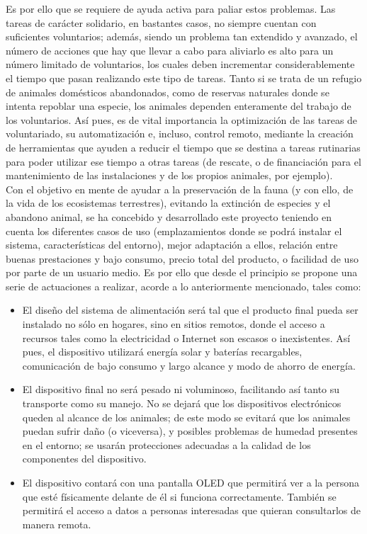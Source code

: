 \documentclass[12pt]{article}
\begin{document}
	\noindent Es por ello que se requiere de ayuda activa para paliar estos problemas. Las tareas de carácter solidario, en bastantes casos, no siempre cuentan con suficientes voluntarios; además, siendo un problema tan extendido y avanzado, el número de acciones que hay que llevar a cabo para aliviarlo es alto para un número limitado de voluntarios, los cuales deben incrementar considerablemente el tiempo que pasan realizando este tipo de tareas. 
	Tanto si se trata de un refugio de animales domésticos abandonados, como de reservas naturales donde se intenta repoblar una especie, los animales dependen enteramente del trabajo de los voluntarios. Así pues, es de vital importancia la optimización de las tareas de voluntariado, su automatización e, incluso, control remoto, mediante la creación de herramientas que ayuden a reducir el tiempo que se destina a tareas rutinarias para poder utilizar ese tiempo a otras tareas (de rescate, o de financiación para el mantenimiento de las instalaciones y de los propios animales, por ejemplo). \\
	
	\noindent Con el objetivo en mente de ayudar a la preservación de la fauna (y con ello, de la vida de los ecosistemas terrestres), evitando la extinción de especies y el abandono animal, se ha concebido y desarrollado este proyecto teniendo en cuenta los diferentes casos de uso (emplazamientos donde se podrá instalar el sistema, características del entorno), mejor adaptación a ellos, relación entre buenas prestaciones y bajo consumo, precio total del producto, o facilidad de uso por parte de un usuario medio. Es por ello que desde el principio se propone una serie de actuaciones a realizar, acorde a lo anteriormente mencionado, tales como: \\
	
	\begin{itemize}
		\item El diseño del sistema de alimentación será tal que el producto final pueda ser instalado no sólo en hogares, sino en sitios remotos, donde el acceso a recursos tales como la electricidad o Internet son escasos o inexistentes. Así pues, el dispositivo utilizará energía solar y baterías recargables, comunicación de bajo consumo y largo alcance y modo de ahorro de energía. 
		\item El dispositivo final no será pesado ni voluminoso, facilitando así tanto su transporte como su manejo. No se dejará que los dispositivos electrónicos queden al alcance de los animales; de este modo se evitará que los animales puedan sufrir daño (o viceversa), y posibles problemas de humedad presentes en el entorno; se usarán protecciones adecuadas a la calidad de los componentes del dispositivo.
		\item El dispositivo contará con una pantalla OLED que permitirá ver a la persona que esté físicamente delante de él si funciona correctamente. También se permitirá el acceso a datos a personas interesadas que quieran consultarlos de manera remota.

	\end{itemize}
\end{document}
